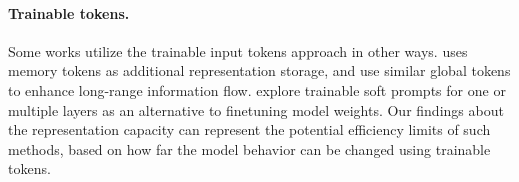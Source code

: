 \paragraph{Trainable tokens.} Some works utilize the trainable input tokens approach in other ways. \citet{burtsev2021memory} uses memory tokens as additional representation storage, \citet{beltagy2020longformer} and \citet{zaheer2020big} use similar global tokens to enhance long-range information flow. \citet{li2021prefix,lester2021power,gao2024selfcp,liu2022ptuning} explore trainable soft prompts for one or multiple layers as an alternative to finetuning model weights. 
Our findings about the representation capacity can represent the potential efficiency limits of such methods, based on how far the model behavior can be changed using trainable tokens.
